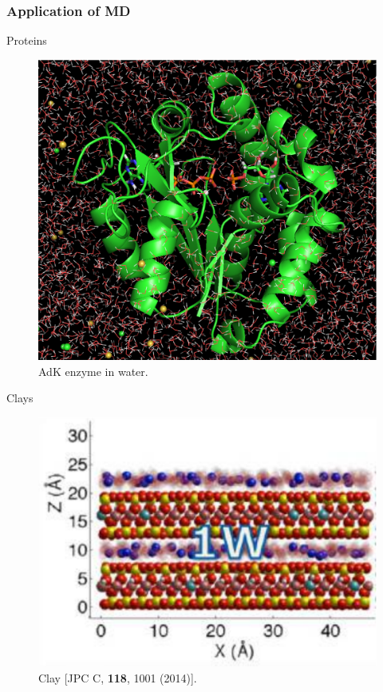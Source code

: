 \documentclass{beamer}
\begin{document}
\begin{frame}
  \frametitle{Application of MD}

\begin{minipage}[t]{0.48\linewidth}

Proteins
\begin{figure}
\includegraphics[scale=0.135]{protein_water_ligand_ions.eps}
\caption{{\scriptsize  AdK enzyme in water.}}
\end{figure}

\end{minipage}
\hfill%
\begin{minipage}[t]{0.48\linewidth}
Clays
\begin{figure}
\includegraphics[scale=0.2]{clay.eps}
\caption{{\scriptsize  Clay [JPC C, {\bf 118}, 1001 (2014)].}}

\end{figure}
\end{minipage}
\end{frame}
\end{document}
